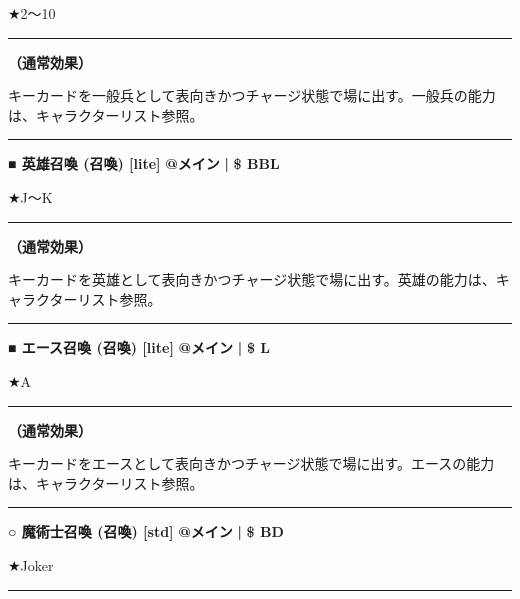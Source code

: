 \documentclass[twocolumn,a5paper,papersize,10pt]{jarticle}
\begin{document}
★2〜10

\vspace{1mm}%
\hrule height 0.1mm depth 0mm width 66.5mm %
\vspace{1mm}%

{\bf（通常効果）}

キーカードを一般兵として表向きかつチャージ状態で場に出す。一般兵の能力は、キャラクターリスト参照。
\vspace{2mm} %
\hrule height 0.5mm depth 0mm width 66.5mm %
\vspace{1mm} %
{\normalsize\bf ■ 英雄召喚 {\scriptsize (召喚) [lite]}} %
\hfill 
{\small\bf @メイン }
  {\small\bf | } {\small\bf \$ BBL}

★J〜K

\vspace{1mm}%
\hrule height 0.1mm depth 0mm width 66.5mm %
\vspace{1mm}%

{\bf（通常効果）}

キーカードを英雄として表向きかつチャージ状態で場に出す。英雄の能力は、キャラクターリスト参照。
\vspace{2mm} %
\hrule height 0.5mm depth 0mm width 66.5mm %
\vspace{1mm} %
{\normalsize\bf ■ エース召喚 {\scriptsize (召喚) [lite]}} %
\hfill 
{\small\bf @メイン }
  {\small\bf | } {\small\bf \$ L}

★A

\vspace{1mm}%
\hrule height 0.1mm depth 0mm width 66.5mm %
\vspace{1mm}%

{\bf（通常効果）}

キーカードをエースとして表向きかつチャージ状態で場に出す。エースの能力は、キャラクターリスト参照。
\vspace{2mm} %
\hrule height 0.5mm depth 0mm width 66.5mm %
\vspace{1mm} %
{\normalsize\bf ○ 魔術士召喚 {\scriptsize (召喚) [std]}} %
\hfill 
{\small\bf @メイン }
  {\small\bf | } {\small\bf \$ BD}

★Joker

\vspace{1mm}%
\hrule height 0.1mm depth 0mm width 66.5mm %
\vspace{1mm}%
\end{document}
